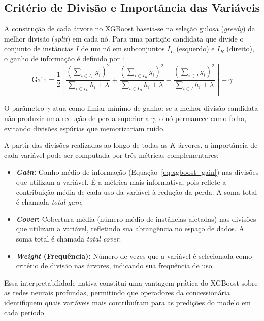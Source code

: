 \subsection{Critério de Divisão e Importância das Variáveis}

A construção de cada árvore no XGBoost baseia-se na seleção gulosa (\textit{greedy}) da melhor divisão (\textit{split}) em cada nó. Para uma partição candidata que divide o conjunto de instâncias $I$ de um nó em subconjuntos $I_L$ (esquerdo) e $I_R$ (direito), o ganho de informação é definido por \cite{chen2016xgboost}:
\begin{equation}
    \text{Gain} = \frac{1}{2} \left[ \frac{\left(\sum_{i \in I_L} g_i\right)^2}{\sum_{i \in I_L} h_i + \lambda} + \frac{\left(\sum_{i \in I_R} g_i\right)^2}{\sum_{i \in I_R} h_i + \lambda} - \frac{\left(\sum_{i \in I} g_i\right)^2}{\sum_{i \in I} h_i + \lambda} \right] - \gamma
    \label{eq:xgboost_gain}
\end{equation}

O parâmetro $\gamma$ atua como limiar mínimo de ganho: se a melhor divisão candidata não produzir uma redução de perda superior a $\gamma$, o nó permanece como folha, evitando divisões espúrias que memorizariam ruído.

A partir das divisões realizadas ao longo de todas as $K$ árvores, a importância de cada variável pode ser computada por três métricas complementares:
\begin{itemize}
    \item \textbf{\textit{Gain}:} Ganho médio de informação (Equação~\ref{eq:xgboost_gain}) nas divisões que utilizam a variável. É a métrica mais informativa, pois reflete a contribuição média de cada uso da variável à redução da perda. A soma total é chamada \textit{total gain}.
    \item \textbf{\textit{Cover}:} Cobertura média (número médio de instâncias afetadas) nas divisões que utilizam a variável, refletindo sua abrangência no espaço de dados. A soma total é chamada \textit{total cover}.
    \item \textbf{\textit{Weight} (Frequência):} Número de vezes que a variável é selecionada como critério de divisão nas árvores, indicando sua frequência de uso.
\end{itemize}

Essa interpretabilidade nativa constitui uma vantagem prática do XGBoost sobre as redes neurais profundas, permitindo que operadores da concessionária identifiquem quais variáveis mais contribuíram para as predições do modelo em cada período.

